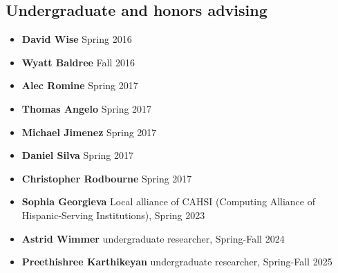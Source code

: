 \subsection*{Undergraduate and honors advising}
    

\begin{itemize}    
      \item\textbf{David Wise} Spring 2016
      \item\textbf{Wyatt Baldree} Fall 2016
      \item\textbf{Alec Romine} Spring 2017
      \item\textbf{Thomas Angelo}  Spring 2017
      \item\textbf{Michael Jimenez} Spring 2017
      \item\textbf{Daniel Silva} Spring 2017
      \item\textbf{Christopher Rodbourne} Spring 2017
      \item\textbf{Sophia Georgieva} Local alliance of CAHSI (Computing Alliance of Hispanic-Serving Institutions), Spring 2023
      \item\textbf{Astrid Wimmer} undergraduate researcher, Spring-Fall 2024
      \item\textbf{Preethishree Karthikeyan} undergraduate researcher, Spring-Fall 2025
\end{itemize}